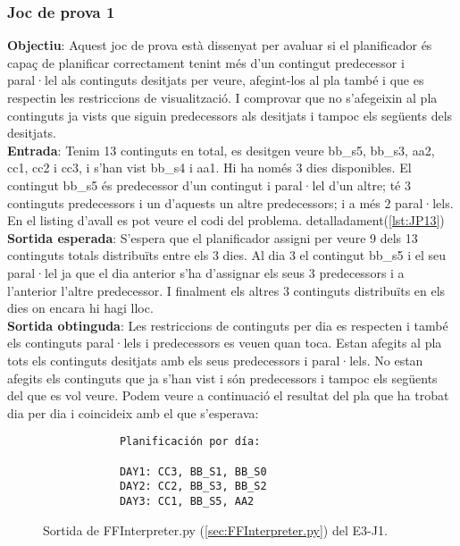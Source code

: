 \documentclass[a4paper]{article}
\begin{document}
	\subsubsection*{Joc de prova 1}
	
	\noindent \textbf{Objectiu}: Aquest joc de prova està dissenyat per avaluar si el planificador és capaç de planificar correctament tenint més d'un contingut predecessor i paral·lel als continguts desitjats per veure, afegint-los al pla també i que es respectin les restriccions de visualització. I comprovar que no s'afegeixin al pla continguts ja vists que siguin predecessors als desitjats i tampoc els següents dels desitjats.  \\
	
	\noindent \textbf{Entrada}: Tenim 13 continguts en total, es desitgen veure bb\_s5, bb\_s3, aa2, cc1, cc2 i cc3, i s'han vist bb\_s4 i aa1. Hi ha només 3 dies disponibles. El contingut bb\_s5 és predecessor d'un contingut i paral·lel d'un altre; té 3 continguts predecessors i un d'aquests un altre predecessors; i a més 2 paral·lels. En el listing d'avall es pot veure el codi del problema.  detalladament(\ref{lst:JP13})\\
	
	\noindent \textbf{Sortida esperada}: S'espera que el planificador assigni per veure 9 dels 13 continguts totals distribuïts entre els 3 dies. Al dia 3 el contingut bb\_s5 i el seu paral·lel ja que el dia anterior s'ha d'assignar els seus 3 predecessors i a l'anterior l'altre predecessor. I finalment els altres 3 continguts distribuïts en els dies on encara hi hagi lloc. \\
	
	\noindent \textbf{Sortida obtinguda}: Les restriccions de continguts per dia es respecten i també els continguts paral·lels i predecessors es veuen quan toca.  Estan afegits al pla tots els continguts desitjats amb els seus predecessors i paral·lels. No estan afegits els continguts que ja s'han vist i són predecessors i tampoc els següents del que es vol veure. Podem veure a continuació el resultat del pla que ha trobat dia per dia i coincideix amb el que s'esperava:
	
	\begin{figure}[H]
		\centering
		\begin{verbatim}
			Planificación por día:
			
			DAY1: CC3, BB_S1, BB_S0
			DAY2: CC2, BB_S3, BB_S2
			DAY3: CC1, BB_S5, AA2
		\end{verbatim}
		\caption{Sortida de FFInterpreter.py (\ref{sec:FFInterpreter.py}) del E3-J1.}
	\end{figure}
	
\end{document}

